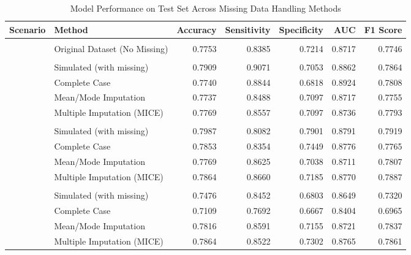 \documentclass[
  letterpaper,
  DIV=11,
  numbers=noendperiod]{scrartcl}
\begin{document}
\begin{table}[H]
\centering
\caption{Model Performance on Test Set Across Missing Data Handling Methods}
\centering
\begin{tabular}[t]{llrrrrr}
\toprule
Scenario & Method & Accuracy & Sensitivity & Specificity & AUC & F1 Score\\
\midrule
\addlinespace[0.3em]
\multicolumn{7}{l}{\textbf{Full Dataset}}\\
\hspace{1em} & Original Dataset (No Missing) & 0.7753 & 0.8385 & 0.7214 & 0.8717 & 0.7746\\
\addlinespace[0.3em]
\multicolumn{7}{l}{\textbf{MCAR}}\\
\hspace{1em} & Simulated (with missing) & 0.7909 & 0.9071 & 0.7053 & 0.8862 & 0.7864\\
\hspace{1em} & Complete Case & 0.7740 & 0.8844 & 0.6818 & 0.8924 & 0.7808\\
\hspace{1em} & Mean/Mode Imputation & 0.7737 & 0.8488 & 0.7097 & 0.8717 & 0.7755\\
\hspace{1em} & Multiple Imputation (MICE) & 0.7769 & 0.8557 & 0.7097 & 0.8736 & 0.7793\\
\addlinespace[0.3em]
\multicolumn{7}{l}{\textbf{MAR}}\\
\hspace{1em} & Simulated (with missing) & 0.7987 & 0.8082 & 0.7901 & 0.8791 & 0.7919\\
\hspace{1em} & Complete Case & 0.7853 & 0.8354 & 0.7449 & 0.8776 & 0.7765\\
\hspace{1em} & Mean/Mode Imputation & 0.7769 & 0.8625 & 0.7038 & 0.8711 & 0.7807\\
\hspace{1em} & Multiple Imputation (MICE) & 0.7864 & 0.8660 & 0.7185 & 0.8770 & 0.7887\\
\addlinespace[0.3em]
\multicolumn{7}{l}{\textbf{MNAR}}\\
\hspace{1em} & Simulated (with missing) & 0.7476 & 0.8452 & 0.6803 & 0.8649 & 0.7320\\
\hspace{1em} & Complete Case & 0.7109 & 0.7692 & 0.6667 & 0.8404 & 0.6965\\
\hspace{1em} & Mean/Mode Imputation & 0.7816 & 0.8591 & 0.7155 & 0.8721 & 0.7837\\
\hspace{1em} & Multiple Imputation (MICE) & 0.7864 & 0.8522 & 0.7302 & 0.8765 & 0.7861\\
\bottomrule
\end{tabular}
\end{table}
\end{document}
